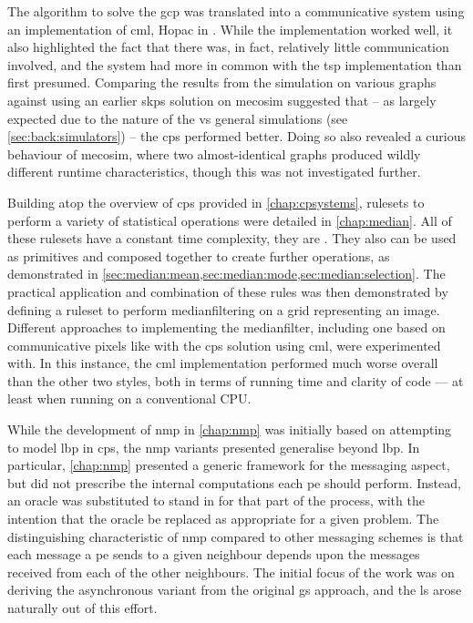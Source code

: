 The algorithm to solve the \gls{gcp} was translated into a communicative system using an implementation of \gls{cml}, Hopac in \fsharp{}.  While the implementation worked well, it also highlighted the fact that there was, in fact, relatively little communication involved, and the system had more in common with the \gls{tsp} implementation than first presumed.  Comparing the results from the simulation on various graphs against using an earlier \gls{skps} solution on \gls{mecosim} suggested that -- as largely expected due to the nature of the \adhoc{} vs general simulations (see \vref{sec:back:simulators}) -- the \gls{cps} performed better.  Doing so also revealed a curious behaviour of \gls{mecosim}, where two almost-identical graphs produced wildly different runtime characteristics, though this was not investigated further.

Building atop the overview of \gls{cps} provided in \cref{chap:cpsystems}, \glspl{ruleset} to perform a variety of statistical operations were detailed in \cref{chap:median}.  All of these rulesets have a constant time complexity, \ie{} they are .  They also can be used as primitives and composed together to create further operations, as demonstrated in \eg{} \cref{sec:median:mean,sec:median:mode,sec:median:selection}.  The practical application and combination of these rules was then demonstrated by defining a ruleset to perform \gls{medianfilter}ing on a grid representing an image.  Different approaches to implementing the \gls{medianfilter}, including one based on communicative pixels like with the \gls{cps} solution using \gls{cml}, were experimented with.  In this instance, the \gls{cml} implementation performed much worse overall than the other two styles, both in terms of running time and clarity of code --- at least when running on a conventional CPU.

While the development of \gls{nmp} in \cref{chap:nmp} was initially based on attempting to model \gls{lbp} in \gls{cps}, the \gls{nmp} variants presented generalise beyond \gls{lbp}.  In particular, \cref{chap:nmp} presented a generic framework for the messaging aspect, but did not prescribe the internal computations each \gls{pe} should perform.  Instead, an oracle was substituted to stand in for that part of the process, with the intention that the oracle be replaced as appropriate for a given problem.  The distinguishing characteristic of \gls{nmp} compared to other messaging schemes is that each message a \gls{pe} sends to a given neighbour depends upon the messages received from each of the other neighbours.  The initial focus of the work was on deriving the asynchronous variant from the original \gls{gs} approach, and the \gls{ls} arose naturally out of this effort.

